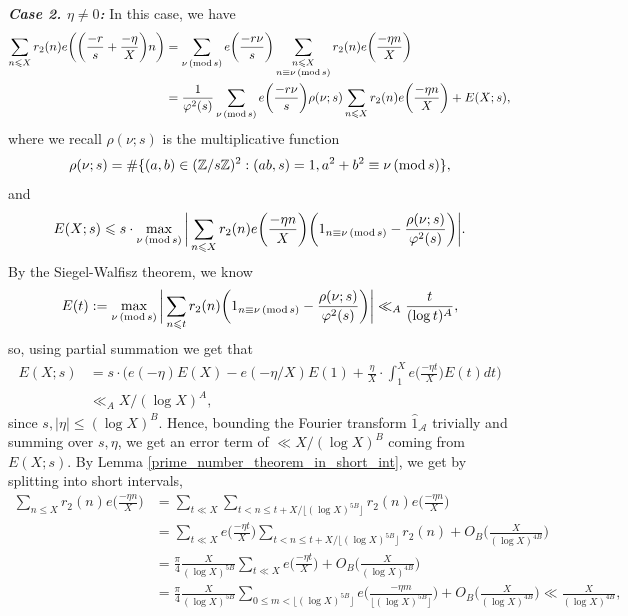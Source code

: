 \documentclass[12pt]{amsart}
\theoremstyle{definition}
\theoremstyle{definition}
\theoremstyle{remark}
\numberwithin{equation}{section}
\newcommand{\Z}{\mathbb{Z}}
\newcommand{\CA}{\mathcal{A}}
\renewcommand{\leq}{\leqslant}
\renewcommand{\hat}{\widehat}
\renewcommand{\mod}[1]{\,({\rm mod}\,#1)}
\begin{document}
\noindent \textit{\textbf{Case 2. $\eta\not=0$:}} 
In this case, we have
\begin{align*}
\sum_{n\leq X} r_2(n) e\bigg(\bigg(\frac{-r }{s} + \frac{-\eta }{X} \bigg) n \bigg) &= \sum_{\nu\mod s} e\bigg( \frac{-r\nu}{s}\bigg) \sum_{\substack{n\leq X \\ n\equiv \nu \mod s}} r_2(n) e\bigg(\frac{-\eta n}{X}\bigg)\\
&= \frac{1}{\varphi^2(s)}\sum_{\nu\mod s} e\bigg( \frac{-r\nu}{s}\bigg)  \rho(\nu;s) \sum_{n\leq X} r_2(n) e\bigg(\frac{-\eta n}{X}\bigg)+ E( X ;s),
\end{align*}
where we recall $\rho(\nu;s)$ is the multiplicative function
$$ \rho(\nu;s) = \#\{ (a,b)\in (\Z/s\Z)^2 : (ab,s)=1,  a^2+b^2\equiv \nu \mod s \}, $$
and
$$E(X;s) \leq s \cdot \max_{\nu\mod s}\bigg| \sum_{n\leq X} r_2(n) e\bigg( \frac{-\eta n}{X} \bigg) \bigg(1_{n\equiv \nu \mod s} - \frac{\rho(\nu;s)}{\varphi^2(s)}\bigg) \bigg| . $$
By the Siegel-Walfisz theorem, we know 
$$E(t) :=\max_{\nu\mod s}\bigg|\sum_{n\leq t}  r_2(n) \bigg(1_{n\equiv \nu \mod s} - \frac{\rho(\nu;s)}{\varphi^2(s)}\bigg) \bigg| \ll_A \frac{t}{(\log t)^A},$$
so, using partial summation we get that
\begin{align}
E(X;s) &= s\cdot \bigg( e(-\eta) E(X) - e(-\eta/X)E(1) + \frac{\eta}{X}\cdot \int_1^X  e\bigg( \frac{-\eta t}{X} \bigg) E(t) dt \bigg) \nonumber \\
&\ll_A X/(\log X)^A  \label{siegel_walfisz_bound},
\end{align} 
since $s, |\eta| \leq (\log X)^B$. Hence, bounding the Fourier transform $\hat{1}_{\CA}$ trivially and summing over $s,\eta$, we get an error term of $\ll X/(\log X)^B$ coming from $E(X;s)$. By Lemma \ref{prime_number_theorem_in_short_int}, we get by splitting into short intervals,
\begin{align}
\sum_{n\leq X} r_2(n) e\bigg(\frac{-\eta n }{X} \bigg) &= \sum_{t\ll X} \sum_{t < n \leq t + X/\lfloor (\log X)^{5B}\rfloor} r_2(n) e\bigg(\frac{-\eta n }{X} \bigg) \nonumber  \\
&= \sum_{t\ll X} e\bigg( \frac{-\eta t}{X} \bigg) \sum_{t<n\leq t+X/\lfloor (\log X)^{5B} \rfloor} r_2(n) + O_B \bigg( \frac{X}{(\log X)^{4B}} \bigg)  \nonumber \\
&= \frac{\pi}{4} \frac{X}{(\log X)^{5B}} \sum_{t\ll X} e\bigg( \frac{-\eta t}{X} \bigg) + O_B\bigg( \frac{X}{(\log X)^{4B}} \bigg) \nonumber \\
&= \frac{\pi}{4} \frac{X}{(\log X)^{5B}} \sum_{0\leq m < \lfloor (\log X)^{5B}\rfloor}e\bigg( \frac{-\eta m}{\lfloor (\log X)^{5B}\rfloor} \bigg) + O_B \bigg( \frac{X}{(\log X)^{4B}} \bigg) \ll \frac{X}{(\log X)^{4B}} \label{short_interval_bound},
\end{align}
\end{document}
